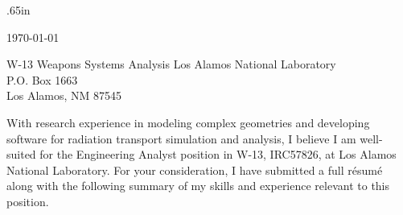\documentclass[a4paper,10pt]{article}
\begin{document}
\pagestyle{empty} 		%
\sloppy 			%


\vspace{5mm}


  \normalsize
  
  \begingroup
  \leftskip.65in
  \rightskip\leftskip

  \vspace{4mm} 
  \today \\
  \vspace{2mm}

W-13 Weapons Systems Analysis
Los Alamos National Laboratory \\
P.O. Box 1663 \\
Los Alamos, NM 87545
  
  \vspace{4mm} 

With research experience in modeling complex geometries and developing
software for radiation transport simulation and analysis, I believe I am
well-suited for the Engineering Analyst position in W-13, IRC57826,
at Los Alamos National Laboratory.
For your consideration, I have submitted a full r\'{e}sum\'{e} along with
the following summary of my skills and
experience relevant to this position.


\end{document}
